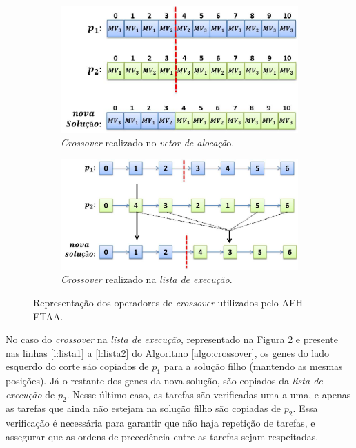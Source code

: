 \begin{figure}[H]
\centering
\begin{subfigure}{.6\textwidth}
  \centering
  \includegraphics[width=1\linewidth]{figure/crossover1.jpg}
  \caption{\textit{Crossover} realizado no \textit{vetor de alocaçã}o.}
  \label{fig:crossover1}
  \vspace{2\baselineskip}
\end{subfigure}
\begin{subfigure}{.6\textwidth}
  \centering
  \includegraphics[width=1\linewidth]{figure/crossover2.jpg}
  \caption{\textit{Crossover} realizado na \textit{lista de execução}.}
  \label{fig:crossover2}
\end{subfigure}
\caption{Representação dos operadores de \textit{crossover} utilizados pelo AEH-ETAA.}
\label{fig:crossover}
\end{figure}


No caso do \textit{crossover} na \textit{lista de execução}, representado na Figura \ref{fig:crossover2} e presente nas linhas \ref{l:lista1} a \ref{l:lista2} do Algoritmo \ref{algo:crossover}, os genes do lado esquerdo do corte são copiados de $p_1$ para a solução filho (mantendo as mesmas posições). Já o restante dos genes da nova solução, são copiados da \textit{lista de execução} de $p_2$. Nesse último caso, as tarefas são verificadas uma a uma, e apenas as tarefas que ainda não estejam na solução filho são copiadas de $p_2$. Essa verificação é necessária para garantir que não haja repetição de tarefas, e assegurar que as ordens de precedência entre as tarefas sejam respeitadas.



